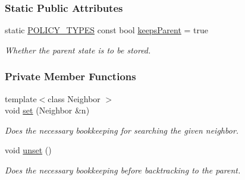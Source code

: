 \subsubsection*{Static Public Attributes}
\begin{DoxyCompactItemize}
\item 
static \hyperlink{extensions_2shared__policies_2headers_8h_ae70a06fa4631780beea14971eb36a562}{P\+O\+L\+I\+C\+Y\+\_\+\+T\+Y\+P\+ES} const bool \hyperlink{structbacktrackLock_1_1Copy_af524e4a6ca5a955d468bcb90f9be0c0e}{keeps\+Parent} = true\hypertarget{structbacktrackLock_1_1Copy_af524e4a6ca5a955d468bcb90f9be0c0e}{}\label{structbacktrackLock_1_1Copy_af524e4a6ca5a955d468bcb90f9be0c0e}

\begin{DoxyCompactList}\small\item\em Whether the parent state is to be stored. \end{DoxyCompactList}\end{DoxyCompactItemize}
\subsubsection*{Private Member Functions}
\begin{DoxyCompactItemize}
\item 
{\footnotesize template$<$class Neighbor $>$ }\\void \hyperlink{structbacktrackLock_1_1Copy_af6284ea7a8847471b0ccdd68d5701812}{set} (Neighbor \&n)
\begin{DoxyCompactList}\small\item\em Does the necessary bookkeeping for searching the given neighbor. \end{DoxyCompactList}\item 
void \hyperlink{structbacktrackLock_1_1Copy_a33802cdb1f994fa64867bbb5b70e5725}{unset} ()\hypertarget{structbacktrackLock_1_1Copy_a33802cdb1f994fa64867bbb5b70e5725}{}\label{structbacktrackLock_1_1Copy_a33802cdb1f994fa64867bbb5b70e5725}

\begin{DoxyCompactList}\small\item\em Does the necessary bookkeeping before backtracking to the parent. \end{DoxyCompactList}\end{DoxyCompactItemize}
